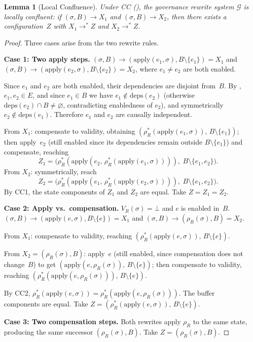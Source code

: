 \documentclass[11pt,a4paper]{article}
\theoremstyle{plain}
\newtheorem{lemma}[theorem]{Lemma}
\theoremstyle{definition}
\theoremstyle{remark}
\begin{document}
\begin{lemma}[Local Confluence]
\label{lem:local-confluence}
Under CC (), the governance rewrite system $\mathcal{G}$ is
locally confluent: if $(\sigma, B) \to X_1$ and $(\sigma, B) \to X_2$,
then there exists a configuration~$Z$ with $X_1 \to^* Z$ and
$X_2 \to^* Z$.
\end{lemma}
\begin{proof}
Three cases arise from the two rewrite rules.

\medskip\noindent\textbf{Case 1: Two apply steps.}\;
$(\sigma, B) \to (\mathrm{apply}(e_1, \sigma), B \setminus \{e_1\})
= X_1$ and
$(\sigma, B) \to (\mathrm{apply}(e_2, \sigma), B \setminus \{e_2\})
= X_2$, where $e_1 \neq e_2$ are both enabled.

Since $e_1$ and $e_2$ are both enabled, their dependencies are disjoint
from~$B$.  By , $e_1, e_2 \in E$, and since $e_1 \in B$ we
have $e_1 \notin \mathrm{deps}(e_2)$ (otherwise
$\mathrm{deps}(e_2) \cap B \neq \varnothing$, contradicting enabledness of
$e_2$), and symmetrically $e_2 \notin \mathrm{deps}(e_1)$.  Therefore $e_1$
and $e_2$ are causally independent.

From $X_1$: compensate to validity, obtaining
$(\rho_R^*(\mathrm{apply}(e_1, \sigma)),\, B \setminus \{e_1\})$; then
apply~$e_2$ (still enabled since its dependencies remain outside
$B \setminus \{e_1\}$) and compensate, reaching
\[
Z_1 = \bigl(\rho_R^*(\mathrm{apply}(e_2,\,
  \rho_R^*(\mathrm{apply}(e_1, \sigma)))),\;
  B \setminus \{e_1, e_2\}\bigr).
\]
From $X_2$: symmetrically, reach
\[
Z_2 = \bigl(\rho_R^*(\mathrm{apply}(e_1,\,
  \rho_R^*(\mathrm{apply}(e_2, \sigma)))),\;
  B \setminus \{e_1, e_2\}\bigr).
\]
By CC1, the state components of $Z_1$ and $Z_2$ are equal.  Take $Z = Z_1 = Z_2$.

\medskip\noindent\textbf{Case 2: Apply vs.\ compensation.}\;
$V_R(\sigma) = \bot$ and $e$ is enabled in~$B$.
$(\sigma, B) \to (\mathrm{apply}(e, \sigma), B \setminus \{e\}) = X_1$
and
$(\sigma, B) \to (\rho_R(\sigma), B) = X_2$.

From $X_1$: compensate to validity, reaching
$(\rho_R^*(\mathrm{apply}(e, \sigma)),\, B \setminus \{e\})$.

From $X_2 = (\rho_R(\sigma), B)$: apply~$e$ (still enabled, since
compensation does not change~$B$) to get
$(\mathrm{apply}(e, \rho_R(\sigma)),\, B \setminus \{e\})$; then
compensate to validity, reaching
$(\rho_R^*(\mathrm{apply}(e, \rho_R(\sigma))),\, B \setminus \{e\})$.

By CC2, $\rho_R^*(\mathrm{apply}(e, \sigma)) =
\rho_R^*(\mathrm{apply}(e, \rho_R(\sigma)))$.  The buffer components
are equal.  Take $Z = (\rho_R^*(\mathrm{apply}(e, \sigma)),\, B \setminus
\{e\})$.

\medskip\noindent\textbf{Case 3: Two compensation steps.}\;
Both rewrites apply $\rho_R$ to the same state, producing the same
successor $(\rho_R(\sigma), B)$.  Take $Z = (\rho_R(\sigma), B)$.
\end{proof}
\end{document}

